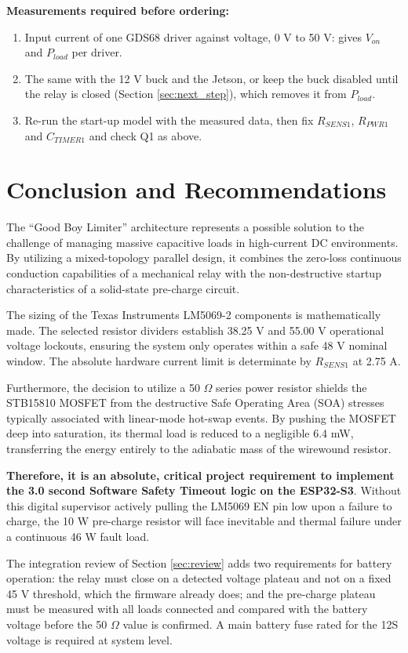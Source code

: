\documentclass[11pt,a4paper]{article}
\begin{document}
\textbf{Measurements required before ordering:}
\begin{enumerate}
    \item Input current of one GDS68 driver against voltage, 0 V to 50 V: gives $V_{on}$ and $P_{load}$ per driver.
    \item The same with the 12 V buck and the Jetson, or keep the buck disabled until the relay is closed (Section \ref{sec:next_step}), which removes it from $P_{load}$.
    \item Re-run the start-up model with the measured data, then fix $R_{SENS1}$, $R_{PWR1}$ and $C_{TIMER1}$ and check Q1 as above.
\end{enumerate}

\section{Conclusion and Recommendations}

The ``Good Boy Limiter'' architecture represents a possible solution to the challenge of managing massive capacitive loads in high-current DC environments. By utilizing a mixed-topology parallel design, it combines the zero-loss continuous conduction capabilities of a mechanical relay with the non-destructive startup characteristics of a solid-state pre-charge circuit.

The sizing of the Texas Instruments LM5069-2 components is mathematically made. The selected resistor dividers establish 38.25 V and 55.00 V operational voltage lockouts, ensuring the system only operates within a safe 48 V nominal window. The absolute hardware current limit is determinate by $R_{SENS1}$ at 2.75 A. 

Furthermore, the decision to utilize a 50 $\Omega$ series power resistor shields the STB15810 MOSFET from the destructive Safe Operating Area (SOA) stresses typically associated with linear-mode hot-swap events. By pushing the MOSFET deep into saturation, its thermal load is reduced to a negligible 6.4 mW, transferring the energy entirely to the adiabatic mass of the wirewound resistor. 

\textbf{Therefore, it is an absolute, critical project requirement to implement the 3.0 second Software Safety Timeout logic on the ESP32-S3}. Without this digital supervisor actively pulling the LM5069 EN pin low upon a failure to charge, the 10 W pre-charge resistor will face inevitable and thermal failure under a continuous 46 W fault load.

The integration review of Section \ref{sec:review} adds two requirements for battery operation: the relay must close on a detected voltage plateau and not on a fixed 45 V threshold, which the firmware already does; and the pre-charge plateau must be measured with all loads connected and compared with the battery voltage before the 50 $\Omega$ value is confirmed. A main battery fuse rated for the 12S voltage is required at system level.
\end{document}
